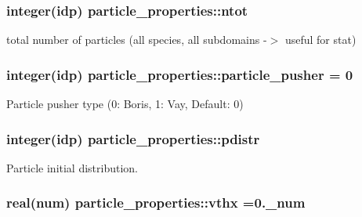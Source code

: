 \subsubsection[{\texorpdfstring{ntot}{ntot}}]{\setlength{\rightskip}{0pt plus 5cm}integer(idp) particle\+\_\+properties\+::ntot}\hypertarget{namespaceparticle__properties_a9fa6e3ec64928bf64db8c78d73f97389}{}\label{namespaceparticle__properties_a9fa6e3ec64928bf64db8c78d73f97389}


total number of particles (all species, all subdomains -\/$>$ useful for stat) 

\subsubsection[{\texorpdfstring{particle\+\_\+pusher}{particle_pusher}}]{\setlength{\rightskip}{0pt plus 5cm}integer(idp) particle\+\_\+properties\+::particle\+\_\+pusher = 0}\hypertarget{namespaceparticle__properties_ab885434a8bf6905c7fbd9108e77175f4}{}\label{namespaceparticle__properties_ab885434a8bf6905c7fbd9108e77175f4}


Particle pusher type (0\+: Boris, 1\+: Vay, Default\+: 0) 

\subsubsection[{\texorpdfstring{pdistr}{pdistr}}]{\setlength{\rightskip}{0pt plus 5cm}integer(idp) particle\+\_\+properties\+::pdistr}\hypertarget{namespaceparticle__properties_aaf6c9fb8697f29ccff6e1d82ee7f477a}{}\label{namespaceparticle__properties_aaf6c9fb8697f29ccff6e1d82ee7f477a}


Particle initial distribution. 

\subsubsection[{\texorpdfstring{vthx}{vthx}}]{\setlength{\rightskip}{0pt plus 5cm}real(num) particle\+\_\+properties\+::vthx =0.\+\_\+num}\hypertarget{namespaceparticle__properties_ab09cf3446a6f6d5cc0c600be909db8c1}{}\label{namespaceparticle__properties_ab09cf3446a6f6d5cc0c600be909db8c1}
